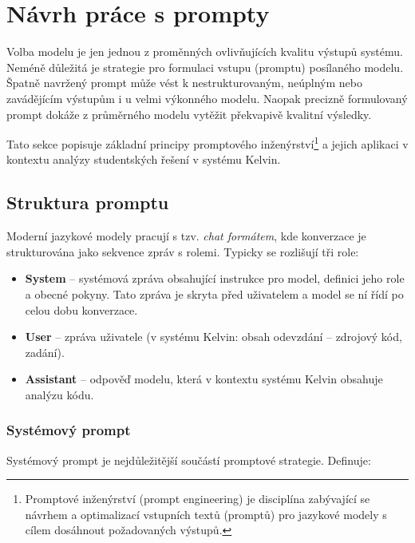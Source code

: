 \section{Návrh práce s prompty}
\label{sec:selection-prompts}

Volba modelu je jen jednou z proměnných ovlivňujících kvalitu výstupů systému.
Neméně důležitá je strategie pro formulaci vstupu (promptu) posílaného modelu.
Špatně navržený prompt může vést k nestrukturovaným, neúplným nebo zavádějícím výstupům i u velmi výkonného modelu.
Naopak precizně formulovaný prompt dokáže z průměrného modelu vytěžit překvapivě kvalitní výsledky.

Tato sekce popisuje základní principy promptového inženýrství\footnote{Promptové inženýrství (prompt engineering) je disciplína zabývající se návrhem a optimalizací vstupních textů (promptů) pro jazykové modely s cílem dosáhnout požadovaných výstupů.}
a jejich aplikaci v kontextu analýzy studentských řešení v systému Kelvin.

\subsection{Struktura promptu}
\label{subsec:prompts-structure}

Moderní jazykové modely pracují s tzv. \emph{chat formátem}, kde konverzace je strukturována jako sekvence zpráv s rolemi.
Typicky se rozlišují tři role:

\begin{itemize}
    \item \textbf{System} -- systémová zpráva obsahující instrukce pro model, definici jeho role a obecné pokyny.
    Tato zpráva je skryta před uživatelem a model se ní řídí po celou dobu konverzace.

    \item \textbf{User} -- zpráva uživatele (v systému Kelvin: obsah odevzdání -- zdrojový kód, zadání).

    \item \textbf{Assistant} -- odpověď modelu, která v kontextu systému Kelvin obsahuje analýzu kódu.
\end{itemize}

\subsubsection*{Systémový prompt}

Systémový prompt je nejdůležitější součástí promptové strategie.
Definuje:


